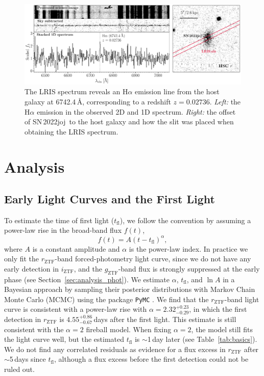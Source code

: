 \documentclass[twocolumn]{aastex631}
\newcommand{\sn}{SN\,2022joj}
\begin{document}
\begin{CJK*}{UTF8}{gbsn}
\begin{figure}
    \centering
    \includegraphics[width=\linewidth]{host_spec.pdf}
    \caption{The LRIS spectrum reveals an H$\alpha$ emission line from the host galaxy at 6742.4\,\AA, corresponding to a redshift $z=0.02736$. \textit{Left:} the H$\alpha$ emission in the observed 2D and 1D spectrum. %
    \textit{Right:} the offset of \sn\ to the host galaxy and how the slit was placed when obtaining the LRIS spectrum.
    }
    \label{fig:host_spec}
\end{figure}

\section{Analysis} \label{sec:analysis}
\subsection{Early Light Curves and the First Light}
To estimate the time of first light ($t_\mathrm{fl}$), we follow the convention \citep[e.g.,][]{Miller_ZTF_2020} by assuming a power-law rise in the broad-band flux $f(t)$,
$$
f(t) = A (t-t_\mathrm{fl})^\alpha,
$$
where $A$ is a constant amplitude and $\alpha$ is the power-law index. In practice we only fit the $r_\mathrm{ZTF}$-band forced-photometry light curve, since we do not have any early detection in $i_\mathrm{ZTF}$, and the $g_\mathrm{ZTF}$-band flux is strongly suppressed at the early phase (see Section~\ref{sec:analysis_phot}). We estimate $\alpha$, $t_\mathrm{fl}$, and $\ln A$ in a Bayesian approach by sampling their posterior distributions with Markov Chain Monte Carlo (MCMC) using the package \texttt{PyMC} \citep{pymc_2016}. We find that the $r_\mathrm{ZTF}$-band light curve is consistent with a power-law rise with $\alpha=2.32^{+0.23}_{-0.29}$, in which the first detection in $r_\mathrm{ZTF}$ is $4.55^{+0.86}_{-0.67}$\,days after the first light. This estimate is still consistent with the $\alpha=2$ fireball model. When fixing $\alpha=2$, the model still fits the light curve well, but the estimated $t_\mathrm{fl}$ is $\sim$1\,day later (see Table~\ref{tab:basics}). We do not find any correlated residuals as evidence for a flux excess in $r_\mathrm{ZTF}$ after $\sim$5\,days since $t_\mathrm{fl}$, although a flux excess before the first detection could not be ruled out.



\end{CJK*}
\end{document}
